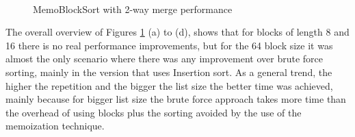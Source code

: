 \documentclass[a4paper,12pt]{article}
\begin{document}
\begin{figure}[H]
\\ %
%
\hfill %
%
\caption{MemoBlockSort with 2-way merge performance}
\label{fig:MemoBlockSort2WayGraph}
\end{figure}

The overall overview of Figures \ref{fig:MemoBlockSort2WayGraph} (a) to (d), shows that for blocks of length 8 and 16 there is no real performance improvements, but for the 64 block size it was almost the only scenario where there was any improvement over brute force sorting, mainly in the version that uses Insertion sort. 
As a general trend, the higher the repetition and the bigger the list size the better time was achieved, mainly because for bigger list size the brute force approach takes more time than the overhead of using blocks plus the sorting avoided by the use of the memoization technique.
\end{document}
